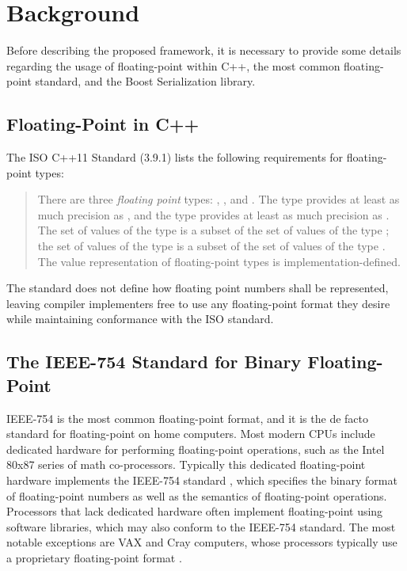 \chapter{Background}
\label{chap:background}
Before describing the proposed framework, it is necessary to provide some details regarding the usage of  floating-point within C++, the most common floating-point standard, and the Boost Serialization library.

\section{Floating-Point in C++}
\label{sec:background_cpp}
The ISO C++11 Standard (3.9.1) \cite{ISO-C++11} lists the following requirements for floating-point types:

\blockquote{
  There are three \textit{floating point} types: , , and .  The type  provides at least as much precision as , and the type  provides at least as much precision as .  The set of values of the type  is a subset of the set of values of the type ; the set of values of the type  is a subset of the set of values of the type .  The value representation of floating-point types is implementation-defined.
}

The standard does not define how floating point numbers shall be represented, leaving compiler implementers free to use any floating-point format they desire while maintaining conformance with the ISO standard.

\section{The IEEE-754 Standard for Binary Floating-Point}
\label{sec:background_ieee754}
IEEE-754 is the most common floating-point format, and it is the de facto standard for floating-point on home computers.  Most modern CPUs include dedicated hardware for performing floating-point operations, such as the Intel 80x87 series of math co-processors. Typically this dedicated floating-point hardware implements the IEEE-754 standard \cite{Intel:80C187}, which specifies the binary format of floating-point numbers as well as the semantics of floating-point operations. Processors that lack dedicated hardware often implement floating-point using software libraries, which may also conform to the IEEE-754 standard. The most notable exceptions are VAX and Cray computers, whose processors typically use a proprietary floating-point format \cite{Obiltschnig:06}.

